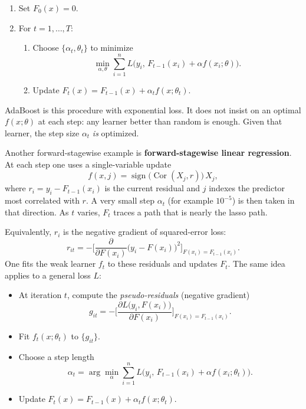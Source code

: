\documentclass[
]{book}
\begin{document}
\begin{enumerate}
\def\labelenumi{\arabic{enumi}.}
\item
  Set \(F_0(x) = 0\).
\item
  For \(t = 1, \ldots, T\):

  \begin{enumerate}
  \def\labelenumii{(\alph{enumii})}
  \item
    Choose \(\{\alpha_t, \theta_t\}\) to minimize
    \[
    \min_{\alpha,\theta}
    \sum_{i=1}^{n} L\bigl(y_i,\, F_{t-1}(x_i) + \alpha f(x_i;\theta)\bigr).
    \]
  \item
    Update \(F_t(x) = F_{t-1}(x) + \alpha_t f(x;\theta_t)\).
  \end{enumerate}
\end{enumerate}

AdaBoost is this procedure with exponential loss. It does not insist on an optimal \(f(x;\theta)\) at each step: any learner better than random is enough. Given that learner, the step size \(\alpha_t\) \emph{is} optimized.

Another forward-stagewise example is \textbf{forward-stagewise linear regression}. At each step one uses a single-variable update
\[
f(x,j) = \operatorname{sign}\bigl(\operatorname{Cor}(X_j, r)\bigr)\, X_j,
\]
where \(r_i = y_i - F_{t-1}(x_i)\) is the current residual and \(j\) indexes the predictor most correlated with \(r\). A very small step \(\alpha_t\) (for example \(10^{-5}\)) is then taken in that direction. As \(t\) varies, \(F_t\) traces a path that is nearly the lasso path.

Equivalently, \(r_i\) is the negative gradient of squared-error loss:
\[
r_{it}
=
-\Biggl[
\frac{\partial}{\partial F(x_i)} \bigl(y_i - F(x_i)\bigr)^2
\Biggr]_{F(x_i)=F_{t-1}(x_i)}.
\]
One fits the weak learner \(f_t\) to these residuals and updates \(F_t\). The same idea applies to a general loss \(L\):

\begin{itemize}
\item
  At iteration \(t\), compute the \emph{pseudo-residuals} (negative gradient)
  \[
  g_{it}
  =
  -\Biggl[
  \frac{\partial L\bigl(y_i, F(x_i)\bigr)}{\partial F(x_i)}
  \Biggr]_{F(x_i)=F_{t-1}(x_i)}.
  \]
\item
  Fit \(f_t(x;\theta_t)\) to \(\{g_{it}\}\).
\item
  Choose a step length
  \[
  \alpha_t
  =
  \arg\min_{\alpha}
  \sum_{i=1}^{n} L\bigl(y_i,\, F_{t-1}(x_i) + \alpha f(x_i;\theta_t)\bigr).
  \]
\item
  Update \(F_t(x) = F_{t-1}(x) + \alpha_t f(x;\theta_t)\).
\end{itemize}
\end{document}
